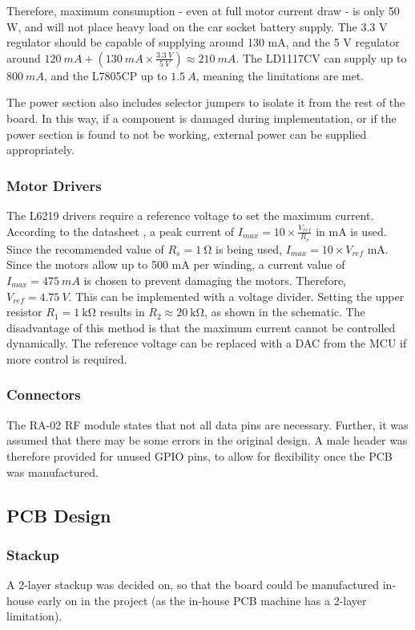 Therefore, maximum consumption - even at full motor current draw - is only 50 W, and will not place heavy load on the car socket battery supply. The 3.3 V regulator should be capable of supplying around 130 mA, and the 5 V regulator around $\SI{120}{mA} + (\SI{130}{mA} \times \frac{\SI{3.3}{V}}{\SI{5}{V}}) \approx \SI{210}{mA}$. The LD1117CV can supply up to $\SI{800}{mA}$, and the L7805CP up to $\SI{1.5}{A}$, meaning the limitations are met.

The power section also includes selector jumpers to isolate it from the rest of the board. In this way, if a component is damaged during implementation, or if the power section is found to not be working, external power can be supplied appropriately.

\subsubsection{Motor Drivers}
The L6219 drivers require a reference voltage to set the maximum current. According to the datasheet \cite{datasheet-L6219}, a peak current of $I_{max} = 10 \times \frac{V_{ref}}{R_s}$ in mA is used. Since the recommended value of $R_s = \SI{1}{\ohm}$ is being used, $I_{max} = 10 \times V_{ref}$ mA. Since the motors allow up to 500 mA per winding, a current value of $I_{max} = \SI{475}{mA}$ is chosen to prevent damaging the motors. Therefore, $V_{ref} = \SI{4.75}{V}$. This can be implemented with a voltage divider. Setting the upper resistor $R_1 = \SI{1}{\kilo \ohm}$ results in $R_2 \approx \SI{20}{\kilo \ohm}$, as shown in the schematic. The disadvantage of this method is that the maximum current cannot be controlled dynamically. The reference voltage can be replaced with a DAC from the MCU if more control is required.

\subsubsection{Connectors}
The RA-02 RF module states that not all data pins are necessary. Further, it was assumed that there may be some errors in the original design. A male header was therefore provided for unused GPIO pins, to allow for flexibility once the PCB was manufactured.

\subsection{PCB Design}
\subsubsection{Stackup}
A 2-layer stackup was decided on, so that the board could be manufactured in-house early on in the project (as the in-house PCB machine has a 2-layer limitation).

